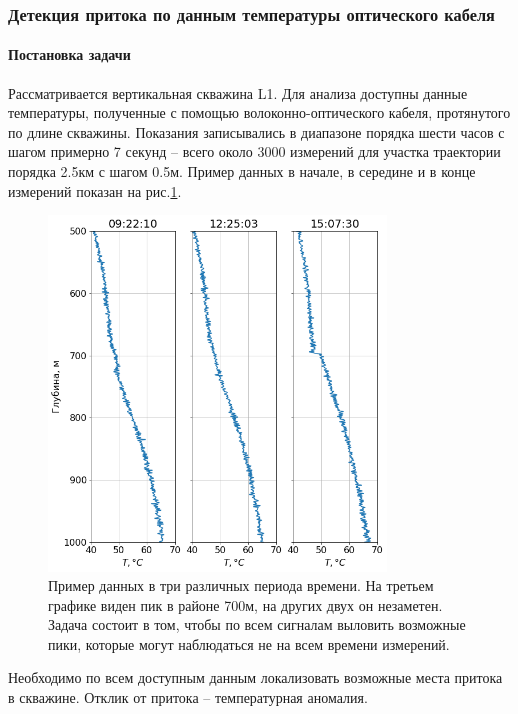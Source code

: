 \subsubsection{Детекция притока по данным температуры оптического кабеля}

\paragraph{Постановка задачи}
\par
Рассматривается вертикальная скважина L1. Для анализа доступны данные температуры, полученные с помощью волоконно-оптического кабеля, протянутого по длине скважины. Показания записывались в диапазоне порядка шести часов с шагом примерно 7 секунд – всего около 3000 измерений для участка траектории порядка 2.5км с шагом 0.5м. Пример данных в начале, в середине и в конце измерений показан на рис.\ref{fig:leakage_data}.

\begin{figure}[H]
\centering
\includegraphics[width=0.8\textwidth]{PLT/leakage_data.png}
\caption{Пример данных в три различных периода времени. На третьем графике виден пик в районе 700м, на других двух он незаметен. Задача состоит в том, чтобы по всем сигналам выловить возможные пики, которые могут наблюдаться не на всем времени измерений.}
\label{fig:leakage_data}
\end{figure}

\par
Необходимо по всем доступным данным локализовать возможные места притока в скважине. Отклик от притока – температурная аномалия.


